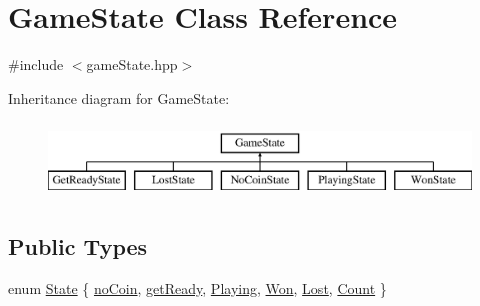 \hypertarget{class_game_state}{}\section{Game\+State Class Reference}
\label{class_game_state}


{\ttfamily \#include $<$game\+State.\+hpp$>$}

Inheritance diagram for Game\+State\+:\begin{figure}[H]
\begin{center}
\leavevmode
\includegraphics[height=2.000000cm]{class_game_state}
\end{center}
\end{figure}
\subsection*{Public Types}
\begin{DoxyCompactItemize}
\item 
enum \hyperlink{class_game_state_a81618e0403319d48e9f25347111f8157}{State} \{ \newline
\hyperlink{class_game_state_a81618e0403319d48e9f25347111f8157ad554378cedc28c806c2abc5da3091455}{no\+Coin}, 
\hyperlink{class_game_state_a81618e0403319d48e9f25347111f8157a1b334dd547fee485fccb33f336e64922}{get\+Ready}, 
\hyperlink{class_game_state_a81618e0403319d48e9f25347111f8157a0c7c919903ffb50f3d56b0ef11fb5532}{Playing}, 
\hyperlink{class_game_state_a81618e0403319d48e9f25347111f8157aec55aaf1858ada4e8896fcad78f574a8}{Won}, 
\newline
\hyperlink{class_game_state_a81618e0403319d48e9f25347111f8157a4f2379bcd5431f1a2fd56f96c9b8ebfb}{Lost}, 
\hyperlink{class_game_state_a81618e0403319d48e9f25347111f8157a9d9e2cb82e9bb0c70fa650a2642c5271}{Count}
 \}
\end{DoxyCompactItemize}
